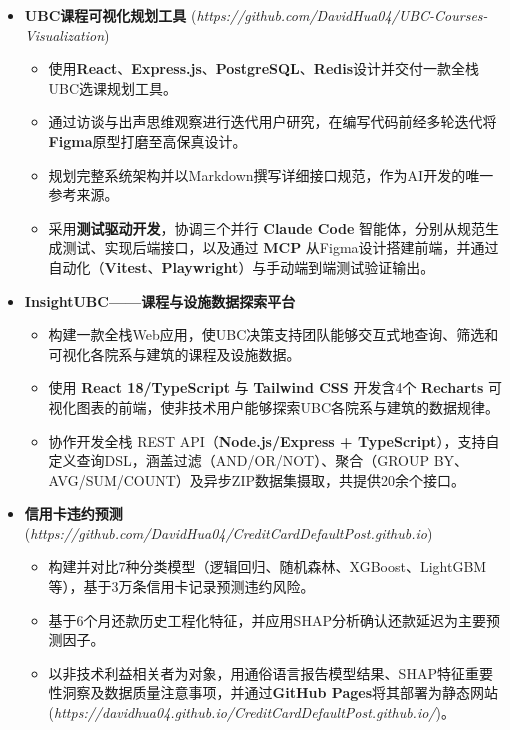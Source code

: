 \documentclass{resume}
\begin{document}
\begin{itemize}[parsep=0.2ex]
  \item \textbf{UBC课程可视化规划工具} (\textit{https://github.com/DavidHua04/UBC-Courses-Visualization})
  \begin{itemize}
    \item 使用\textbf{React}、\textbf{Express.js}、\textbf{PostgreSQL}、\textbf{Redis}设计并交付一款全栈UBC选课规划工具。
    \item 通过访谈与出声思维观察进行迭代用户研究，在编写代码前经多轮迭代将\textbf{Figma}原型打磨至高保真设计。
    \item 规划完整系统架构并以Markdown撰写详细接口规范，作为AI开发的唯一参考来源。
    \item 采用\textbf{测试驱动开发}，协调三个并行 \textbf{Claude Code} 智能体，分别从规范生成测试、实现后端接口，以及通过 \textbf{MCP} 从Figma设计搭建前端，并通过自动化（\textbf{Vitest}、\textbf{Playwright}）与手动端到端测试验证输出。
  \end{itemize}
  \item \textbf{InsightUBC——课程与设施数据探索平台}
  \begin{itemize}
    \item 构建一款全栈Web应用，使UBC决策支持团队能够交互式地查询、筛选和可视化各院系与建筑的课程及设施数据。
    \item 使用 \textbf{React 18/TypeScript} 与 \textbf{Tailwind CSS} 开发含4个 \textbf{Recharts} 可视化图表的前端，使非技术用户能够探索UBC各院系与建筑的数据规律。
    \item 协作开发全栈 REST API（\textbf{Node.js/Express + TypeScript}），支持自定义查询DSL，涵盖过滤（AND/OR/NOT）、聚合（GROUP BY、AVG/SUM/COUNT）及异步ZIP数据集摄取，共提供20余个接口。
  \end{itemize}
  \item \textbf{信用卡违约预测} (\textit{https://github.com/DavidHua04/CreditCardDefaultPost.github.io})
  \begin{itemize}
    \item 构建并对比7种分类模型（逻辑回归、随机森林、XGBoost、LightGBM等），基于3万条信用卡记录预测违约风险。
    \item 基于6个月还款历史工程化特征，并应用SHAP分析确认还款延迟为主要预测因子。
    \item 以非技术利益相关者为对象，用通俗语言报告模型结果、SHAP特征重要性洞察及数据质量注意事项，并通过\textbf{GitHub Pages}将其部署为静态网站 (\textit{https://davidhua04.github.io/CreditCardDefaultPost.github.io/})。
  \end{itemize}
\end{itemize}
\end{document}
